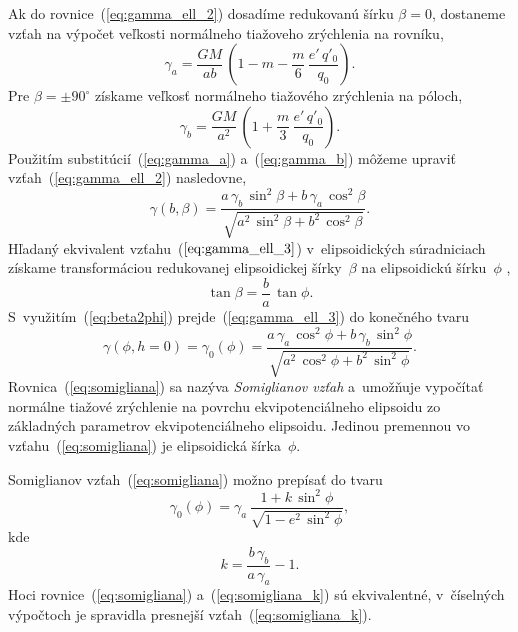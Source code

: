 \documentclass[a4paper, 12pt]{book}
\begin{document}
Ak do rovnice~(\ref{eq:gamma_ell_2}) dosadíme redukovanú šírku $\beta = 0$, 
dostaneme vzťah na výpočet veľkosti normálneho tiažoveho zrýchlenia na rovníku,
%
\begin{equation}
\label{eq:gamma_a}
\gamma_a = \frac{GM}{ab} \, \left( 1 - m - \frac{m}{6} \, \frac{e' \, 
q'_0}{q_0} \right){.}
\end{equation}
%
Pre $\beta = \pm 90^\circ$ získame veľkosť normálneho tiažového zrýchlenia na 
póloch,
%
\begin{equation}
\label{eq:gamma_b}
\gamma_b = \frac{GM}{a^2} \, \left( 1 + \frac{m}{3} \, \frac{e' \, q'_0}{q_0} 
\right){.}
\end{equation}
%
Použitím substitúcií~(\ref{eq:gamma_a}) a~(\ref{eq:gamma_b}) môžeme upraviť 
vzťah~(\ref{eq:gamma_ell_2}) nasledovne,
%
\begin{equation}
\label{eq:gamma_ell_3}
\gamma(b, \beta) = \frac{a \, \gamma_b \, \sin^2\beta + b \, \gamma_a \, 
\cos^2\beta}{\sqrt{a^2 \, \sin^2\beta + b^2 \, \cos^2\beta}}{.}
\end{equation}
%
Hľadaný ekvivalent vzťahu~($\ref{eq:gamma_ell_3}$) v~elipsoidických 
súradniciach získame transformáciou redukovanej elipsoidickej šírky~$\beta$ na 
elipsoidickú šírku~$\phi$ \parencite[napríklad][]{MoritzPhysicalGeodesy},
%
\begin{equation}
\label{eq:beta2phi}
\tan \beta = \frac{b}{a} \, \tan\phi{.}
\end{equation}
%
S~využitím~(\ref{eq:beta2phi}) prejde~(\ref{eq:gamma_ell_3}) do konečného tvaru
%
\begin{equation}
\label{eq:somigliana}
\gamma(\phi, h = 0) = \gamma_0(\phi) = \frac{a \, \gamma_a \, \cos^2\phi + b \, 
\gamma_b \, \sin^2\phi}{\sqrt{a^2 \, \cos^2\phi + b^2 \, \sin^2\phi}}{.}
\end{equation}
%
Rovnica~(\ref{eq:somigliana}) sa nazýva \emph{Somiglianov vzťah} a~umožňuje 
vypočítať normálne tiažové zrýchlenie na povrchu ekvipotenciálneho elipsoidu zo 
základných parametrov ekvipotenciálneho elipsoidu.  Jedinou premennou vo 
vzťahu~(\ref{eq:somigliana}) je elipsoidická šírka~$\phi$.

Somiglianov vzťah~(\ref{eq:somigliana}) možno prepísať do tvaru 
\parencite{GRS80}
%
\begin{equation}
\label{eq:somigliana_k}
\gamma_0(\phi) = \gamma_a \, \frac{1 + k \, \sin^2\phi}{\sqrt{1 - e^2 \, 
\sin^2\phi}}{,}
\end{equation}
%
kde
%
\begin{equation}
k = \frac{b \, \gamma_b}{a \, \gamma_a} - 1{.}
\end{equation}
%
Hoci rovnice~(\ref{eq:somigliana}) a~(\ref{eq:somigliana_k}) sú ekvivalentné, 
v~číselných výpočtoch je spravidla presnejší vzťah~(\ref{eq:somigliana_k}).
\end{document}
